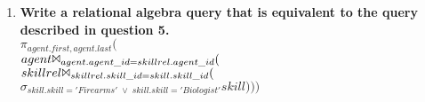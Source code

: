 \documentclass{article}
\begin{document}
\begin{enumerate}
\item
\textbf{Write a relational algebra query that is equivalent to the query described in question 5.\\}
$\pi_{agent.first,agent.last}($\\
$agent \Bowtie_{agent.agent\_id=skillrel.agent\_id} ($\\
$skillrel \Bowtie_{skillrel.skill\_id=skill.skill\_id} ($\\
$\sigma_{skill.skill='Firearms'\; \vee\; skill.skill='Biologist'}skill)))$\\

\end{enumerate}
\end{document}
